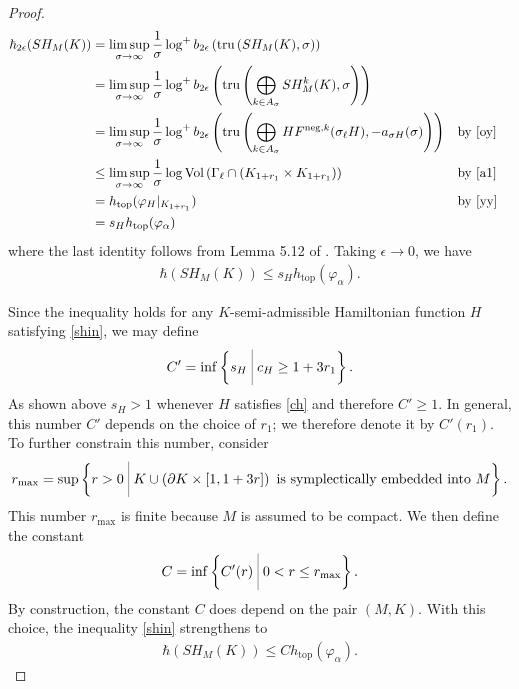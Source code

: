 \documentclass[12pt]{amsart}
\def\bigmid{\ \rule[-3.5mm]{0.1mm}{9mm}\ }
\theoremstyle{definition}
\begin{document}
\begin{proof}
    \begin{align*}
    \hbar_{2\epsilon}(SH_M(K))&= 
    \limsup_{\sigma \to \infty} \frac{1}{\sigma} \log^+ b_{2\epsilon} \left( \textrm{tru}\left(  SH_M(K),\sigma \right) \right) \\
    &= \limsup_{\sigma \to \infty} \frac{1}{\sigma} \log^+ b_{2\epsilon} \left( \textrm{tru}\left( \bigoplus_{k \in A_\sigma} SH^{k}_M(K),\sigma \right) \right) \\
    &= \limsup_{\sigma \to \infty} \frac{1}{\sigma} \log^+ b_{2\epsilon} \left( \textrm{tru}\left(\bigoplus_{k \in A_\sigma}HF^{\textrm{neg},k}(\sigma_\ell H),-a_{\sigma H}(\sigma)\right) \right) &&\textrm{by \eqref{oy}}\\
    &\leq \limsup_{\sigma \to \infty} \frac{1}{\sigma} \log \textrm{Vol}\left( \Gamma_\ell \cap(K_{1+r_1} \times K_{1+r_1}) \right)&&\textrm{by \eqref{a1}}\\
     &= h_{\textrm{top}}(\varphi_{H}|_{K_{1+r_1}}) &&\textrm{by \eqref{yy}}\\&= s_{H} h_{\textrm{top}}(\varphi_\alpha) 
    \end{align*}
    where the last identity follows from Lemma 5.12 of \cite{fls}. Taking $\epsilon \to 0$, we have
\begin{align}\label{shin}
    \hbar(SH_M(K)) \leq s_{H} h_{\textrm{top}}(\varphi_\alpha).
\end{align}

\vspace{0.2cm}

Since the inequality holds for any $K$-semi-admissible Hamiltonian function $H$ satisfying \eqref{shin}, we may define
\begin{align*}
    C'= \inf \left\{s_H \bigmid c_H \geq 1+3r_1  \right\}.
\end{align*}
As shown above $s_H >1$ whenever $H$ satisfies \eqref{ch} and therefore $C' \geq1$. In general, this number $C'$ depends on the choice of $r_1$; we therefore denote it by $C'(r_1)$. To further constrain this number, consider
\begin{align*}
    r_{\textrm{max}} = \sup \left\{r>0\bigmid K \cup\left(\partial K \times [1,1+3r]\right)\,\,\textrm{is symplectically embedded into}\,\,M \right\}.
    \end{align*}
    This number $r_{\textrm{max}}$ is finite because $M$ is assumed to be compact. We then define the constant 
    \begin{align*}
        C = \inf\left\{ C'(r) \bigmid 0<r\leq r_{\textrm{max}} \right\}.
    \end{align*}
    By construction, the constant $C$ does depend on the pair  $(M,K) $. With this choice, the inequality \eqref{shin} strengthens to
    \begin{align*}
        \hbar(SH_M(K)) \leq C h_{\textrm{top}}(\varphi_\alpha).
    \end{align*}
\end{proof}
\end{document}
